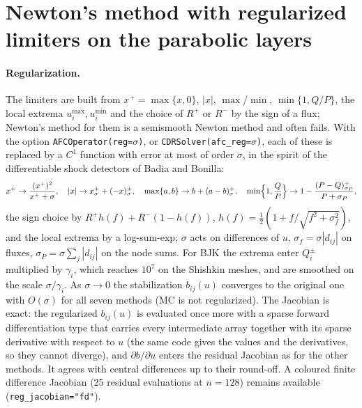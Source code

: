 \documentclass[11pt]{article}
\begin{document}
\section{Newton's method with regularized limiters on the parabolic layers}\label{sec:nreg}

\paragraph{Regularization.} The limiters are built from $x^+=\max\{x,0\}$, $|x|$, $\max$/$\min$, $\min\{1,Q/P\}$,
the local extrema $u_i^{\max},u_i^{\min}$ and the choice of $R^+$ or $R^-$ by the sign of a flux; Newton's method
for them is a semismooth Newton method and often fails. With the option \texttt{AFCOperator(reg=$\sigma$)}, or
\texttt{CDRSolver(afc\_reg=$\sigma$)}, each of these is replaced by a $C^1$ function with error at most of order
$\sigma$, in the spirit of the differentiable shock detectors of Badia and Bonilla:
\[
  x^+\to\frac{(x^+)^2}{x^++\sigma},\quad |x|\to x^+_\sigma+(-x)^+_\sigma,\quad \max\{a,b\}\to b+(a-b)^+_\sigma,\quad
  \min\Bigl\{1,\frac QP\Bigr\}\to1-\frac{(P-Q)^+_{\sigma_P}}{P+\sigma_P},
\]
the sign choice by $R^+h(f)+R^-(1-h(f))$, $h(f)=\frac12(1+f/\sqrt{f^2+\sigma_f^2})$, and the local extrema by a
log-sum-exp; $\sigma$ acts on differences of $u$, $\sigma_f=\sigma|d_{ij}|$ on fluxes, $\sigma_P=\sigma\sum_j|d_{ij}|$
on the node sums. For BJK the extrema enter $Q_i^\pm$ multiplied by $\gamma_i$, which reaches $10^7$ on the Shishkin
meshes, and are smoothed on the scale $\sigma/\gamma_i$. As $\sigma\to0$ the stabilization $b_{ij}(u)$ converges to the
original one with $O(\sigma)$ for all seven methods (MC is not regularized). The Jacobian is exact: the regularized
$b_{ij}(u)$ is evaluated once more with a sparse forward differentiation type that carries every intermediate array
together with its sparse derivative with respect to $u$ (the same code gives the values and the derivatives, so they
cannot diverge), and $\partial b/\partial u$ enters the residual Jacobian as for the other methods. It agrees with
central differences up to their round-off. A coloured finite difference Jacobian (25 residual evaluations at $n=128$)
remains available (\texttt{reg\_jacobian="fd"}).
\end{document}

